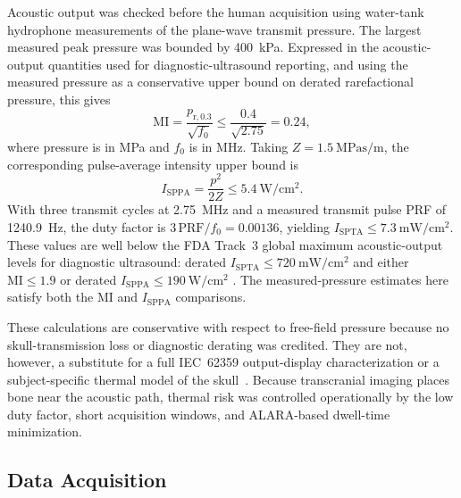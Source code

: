 \documentclass[11pt]{article}
\begin{document}
Acoustic output was checked before the human acquisition using
water-tank hydrophone measurements of the plane-wave transmit pressure.
The largest measured peak pressure was bounded by
\SI{400}{\kilo\pascal}.  Expressed in the acoustic-output quantities
used for diagnostic-ultrasound reporting, and using the measured
pressure as a conservative upper bound on derated rarefactional
pressure, this gives
\begin{equation}
  \mathrm{MI} = \frac{p_{\mathrm{r},0.3}}{\sqrt{f_0}}
  \le \frac{0.4}{\sqrt{2.75}} = 0.24 ,
\end{equation}
where pressure is in MPa and $f_0$ is in MHz.  Taking
$Z=\SI{1.5}{\mega\pascal\second\per\meter}$, the corresponding
pulse-average intensity upper bound is
\begin{equation}
  I_{\mathrm{SPPA}} = \frac{p^2}{2Z}
  \le \SI{5.4}{\watt\per\centi\meter\squared}.
\end{equation}
With three transmit cycles at \SI{2.75}{\mega\hertz} and a measured
transmit pulse PRF of \SI{1240.9}{\hertz}, the duty factor is
$3\,\mathrm{PRF}/f_0 = 0.00136$, yielding
$I_{\mathrm{SPTA}} \le
\SI{7.3}{\milli\watt\per\centi\meter\squared}$.  These values are
well below the FDA Track~3 global maximum acoustic-output levels for
diagnostic ultrasound: derated
$I_{\mathrm{SPTA}}\le\SI{720}{\milli\watt\per\centi\meter\squared}$
and either $\mathrm{MI}\le1.9$ or derated
$I_{\mathrm{SPPA}}\le\SI{190}{\watt\per\centi\meter\squared}$
\cite{fda2023diagnosticultrasound}.  The measured-pressure estimates
here satisfy both the MI and $I_{\mathrm{SPPA}}$ comparisons.

These calculations are conservative with respect to free-field
pressure because no skull-transmission loss or diagnostic derating was
credited.  They are not, however, a substitute for a full IEC~62359
output-display characterization or a subject-specific thermal model of
the skull~\cite{iec62359,aium2022ti}.  Because transcranial imaging
places bone near the acoustic path, thermal risk was controlled
operationally by the low duty factor, short acquisition windows, and
ALARA-based dwell-time minimization.

\subsection{Data Acquisition}
\end{document}
